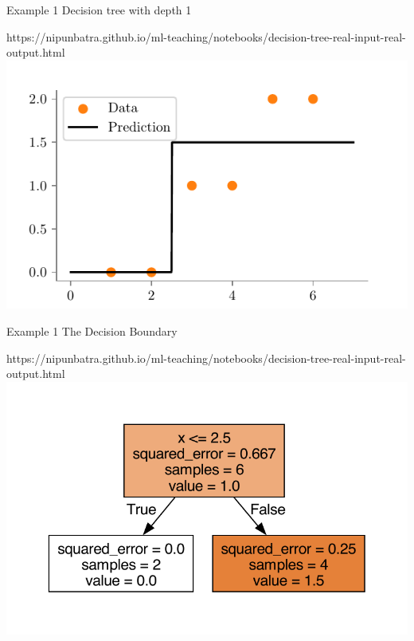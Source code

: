 \documentclass[usenames,dvipsnames]{beamer}
\begin{document}
    \begin{frame}{Example 1}
    Decision tree with depth 1
    \begin{center}
    	\begin{notebookbox}{https://nipunbatra.github.io/ml-teaching/notebooks/decision-tree-real-input-real-output.html}
    		\includegraphics{../assets/decision-trees/figures/ri-ro-depth-1.pdf}
    	\end{notebookbox}	
    \end{center}
    \end{frame}

    \begin{frame}{Example 1}
    The Decision Boundary
    \begin{center}
    	\begin{notebookbox}{https://nipunbatra.github.io/ml-teaching/notebooks/decision-tree-real-input-real-output.html}
    		\includegraphics[scale=0.6]{../assets/decision-trees/figures/ri-ro-depth-1-sklearn.pdf}
    	\end{notebookbox}
    \end{center}
    \end{frame}
\end{document}
